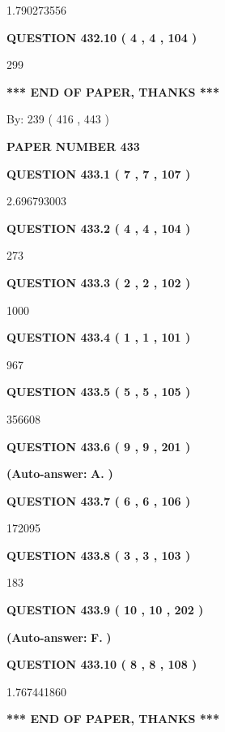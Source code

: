 \documentclass{ctexart}
\begin{document}
1.790273556
  
  
{\textbf{\large{QUESTION
432.10 
 ( 4 , 4 , 104 )
}}}

299
   
   
   
   
\vspace{1.0in} 
{\textbf{\large{ *** END OF PAPER, THANKS *** }}} 
   
   
\hspace{1.0in} By: 
 239 ( 416 ,  443 )
   
   
   
   
\newpage 
\setcounter{page}{ 
   433001 } 
   
   
 {\textbf{ \Large{ PAPER NUMBER  433  }}}
   
   
   
   
  
  
{\textbf{\large{QUESTION
433.1 
 ( 7 , 7 , 107 )
}}}

2.696793003
  
  
{\textbf{\large{QUESTION
433.2 
 ( 4 , 4 , 104 )
}}}

273
  
  
{\textbf{\large{QUESTION
433.3 
 ( 2 , 2 , 102 )
}}}

1000
  
  
{\textbf{\large{QUESTION
433.4 
 ( 1 , 1 , 101 )
}}}

967
  
  
{\textbf{\large{QUESTION
433.5 
 ( 5 , 5 , 105 )
}}}

356608
  
  
{\textbf{\large{QUESTION
433.6 
 ( 9 , 9 , 201 )
}}}
 
 
{\textbf{(Auto-answer:}}
{\textbf{\large{
A.}}}
{\textbf{)}}
 
 
  
  
{\textbf{\large{QUESTION
433.7 
 ( 6 , 6 , 106 )
}}}

172095
  
  
{\textbf{\large{QUESTION
433.8 
 ( 3 , 3 , 103 )
}}}

183
  
  
{\textbf{\large{QUESTION
433.9 
 ( 10 , 10 , 202 )
}}}
 
 
{\textbf{(Auto-answer:}}
{\textbf{\large{
F.}}}
{\textbf{)}}
 
 
  
  
{\textbf{\large{QUESTION
433.10 
 ( 8 , 8 , 108 )
}}}

1.767441860
   
   
   
   
\vspace{1.0in} 
{\textbf{\large{ *** END OF PAPER, THANKS *** }}} 
   
\end{document}
